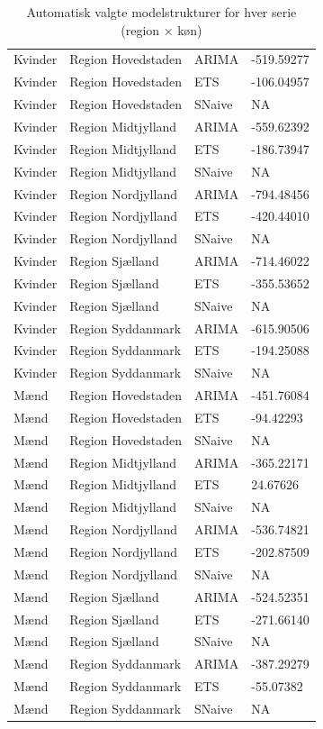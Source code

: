 \documentclass[
]{article}
\begin{document}
\begin{longtable}[t]{llll}
\caption{Automatisk valgte modelstrukturer for hver serie (region × køn)}\\
\toprule
\cellcolor[HTML]{f0f0f0}{\textbf{kon}} & \cellcolor[HTML]{f0f0f0}{\textbf{region}} & \cellcolor[HTML]{f0f0f0}{\textbf{.model}} & \cellcolor[HTML]{f0f0f0}{\textbf{AICc}}\\
\midrule
Kvinder & Region Hovedstaden & ARIMA & -519.59277\\
Kvinder & Region Hovedstaden & ETS & -106.04957\\
Kvinder & Region Hovedstaden & SNaive & NA\\
Kvinder & Region Midtjylland & ARIMA & -559.62392\\
Kvinder & Region Midtjylland & ETS & -186.73947\\
\addlinespace
Kvinder & Region Midtjylland & SNaive & NA\\
Kvinder & Region Nordjylland & ARIMA & -794.48456\\
Kvinder & Region Nordjylland & ETS & -420.44010\\
Kvinder & Region Nordjylland & SNaive & NA\\
Kvinder & Region Sjælland & ARIMA & -714.46022\\
\addlinespace
Kvinder & Region Sjælland & ETS & -355.53652\\
Kvinder & Region Sjælland & SNaive & NA\\
Kvinder & Region Syddanmark & ARIMA & -615.90506\\
Kvinder & Region Syddanmark & ETS & -194.25088\\
Kvinder & Region Syddanmark & SNaive & NA\\
\addlinespace
Mænd & Region Hovedstaden & ARIMA & -451.76084\\
Mænd & Region Hovedstaden & ETS & -94.42293\\
Mænd & Region Hovedstaden & SNaive & NA\\
Mænd & Region Midtjylland & ARIMA & -365.22171\\
Mænd & Region Midtjylland & ETS & 24.67626\\
\addlinespace
Mænd & Region Midtjylland & SNaive & NA\\
Mænd & Region Nordjylland & ARIMA & -536.74821\\
Mænd & Region Nordjylland & ETS & -202.87509\\
Mænd & Region Nordjylland & SNaive & NA\\
Mænd & Region Sjælland & ARIMA & -524.52351\\
\addlinespace
Mænd & Region Sjælland & ETS & -271.66140\\
Mænd & Region Sjælland & SNaive & NA\\
Mænd & Region Syddanmark & ARIMA & -387.29279\\
Mænd & Region Syddanmark & ETS & -55.07382\\
Mænd & Region Syddanmark & SNaive & NA\\
\bottomrule
\end{longtable}
\end{document}
